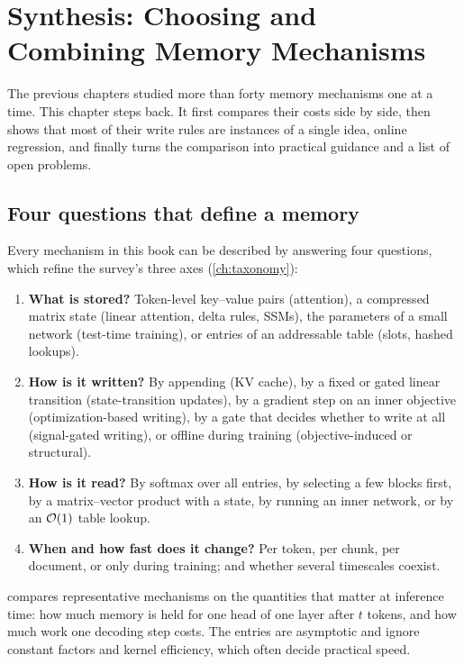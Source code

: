 \chapter{Synthesis: Choosing and Combining Memory Mechanisms}\label{ch:synthesis}

The previous chapters studied more than forty memory mechanisms one at a time. This chapter
steps back. It first compares their costs side by side, then shows that most of their write
rules are instances of a single idea, online regression, and finally turns the comparison into
practical guidance and a list of open problems.

\section{Four questions that define a memory}\label{sec:c14-four}

Every mechanism in this book can be described by answering four questions, which refine the
survey's three axes \citep{zhoubian2026memory} (\cref{ch:taxonomy}):
\begin{enumerate}
  \item \textbf{What is stored?} Token-level key--value pairs (attention), a compressed
    matrix state (linear attention, delta rules, SSMs), the parameters of a small network
    (test-time training), or entries of an addressable table (slots, hashed lookups).
  \item \textbf{How is it written?} By appending (KV cache), by a fixed or gated linear
    transition (state-transition updates), by a gradient step on an inner objective
    (optimization-based writing), by a gate that decides whether to write at all
    (signal-gated writing), or offline during training (objective-induced or structural).
  \item \textbf{How is it read?} By softmax over all entries, by selecting a few blocks
    first, by a matrix--vector product with a state, by running an inner network, or by an
    $\mathcal{O}(1)$ table lookup.
  \item \textbf{When and how fast does it change?} Per token, per chunk, per document, or only
    during training; and whether several timescales coexist.
\end{enumerate}

 compares representative mechanisms on the quantities that matter at
inference time: how much memory is held for one head of one layer after $t$ tokens, and how
much work one decoding step costs. The entries are asymptotic and ignore constant factors and
kernel efficiency, which often decide practical speed.

